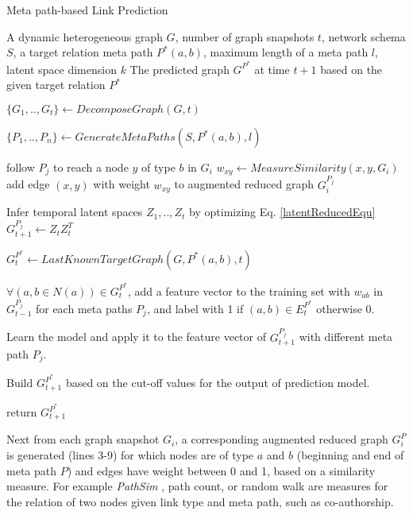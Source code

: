 \begin{algorithm}[t]
\caption{Meta path-based Link Prediction}\label{alg2}
\begin{algorithmic}[1]
\REQUIRE A dynamic heterogeneous graph $G$, number of graph snapshots $t$, network schema $S$, a target relation meta path $P^*(a,b)$, maximum length of a meta path $l$, latent space dimension $k$
\ENSURE The predicted graph $G^{P^*}$ at time $t+1$ based on the given target relation $P^*$

\STATE $\{G_1, .., G_t\} \leftarrow DecomposeGraph(G, t)$

\STATE $\{P_1, .., P_n\} \leftarrow GenerateMetaPaths(S, P^*(a,b), l)$


    
        \STATE follow $P_j$ to reach a node $y$ of type $b$ in $G_i$ 
        \STATE $w_{xy} \leftarrow MeasureSimilarity(x,y, G_i)$
        \STATE add edge $(x,y)$ with weight $w_{xy}$ to augmented reduced graph $G_i^{P_j}$ 
\ENDFOR

\ENDFOR

\STATE Infer temporal latent spaces $Z_1, .., Z_t$ by optimizing Eq. \ref{latentReducedEqu}
\STATE $G^{P_j}_{t+1} \leftarrow Z_tZ^T_t$ 

\ENDFOR

\STATE $G^{P^*}_{t} \leftarrow LastKnownTargetGraph(G, P^*(a,b), t)$


\STATE $\forall (a,b\in N(a)) \in G^{P^*}_{t}$, add a feature vector to the training set with $w_{ab}$ in $G^{P_j}_{t-1}$ for each meta paths $P_j$, and label with 1 if $(a,b) \in E^{P^*}_{t}$ otherwise 0.

\STATE Learn the model and apply it to the feature vector of $G^{P_j}_{t+1}$ with different meta path $P_j$.

\STATE Build $G^{P^*}_{t+1}$ based on the cut-off values for the output of prediction model.

\STATE return $G^{P^*}_{t+1}$
\end{algorithmic}
\end{algorithm}


 Next from each graph snapshot $G_i$, a corresponding augmented reduced graph $G^P_i$ is generated (lines 3-9) for which nodes are of type $a$ and $b$ (beginning and end of meta path $P$) and edges have weight between 0 and 1, based on a similarity measure. For example \textit{PathSim} \cite{sun2011pathsim}, path count, or random walk are measures for the relation of two nodes given link type and meta path, such as co-authorship.

